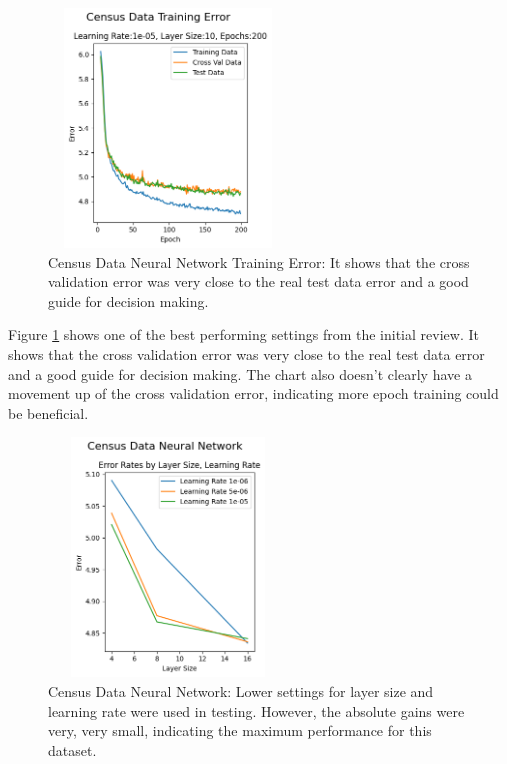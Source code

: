 \documentclass[letterpaper]{article} %
\begin{document}
\begin{figure}[htb]
\centering
\includegraphics[width=2.5in, height=2.5in]{figures/Census_Data_Training_Error_Learning_Rate_chart_one.png}
\caption{Census Data Neural Network Training Error:  It shows that the cross validation error was very close to the real test data error and a good guide for decision making.  }
\label{fig:census_neural_network_error}
\end{figure}

Figure \ref{fig:census_neural_network_error} shows one of the best performing settings from the initial review.  It shows that the cross validation error was very close to the real test data error and a good guide for decision making.  The chart also doesn't clearly have a movement up of the cross validation error, indicating more epoch training could be beneficial.

\begin{figure}[htb]
\centering
\includegraphics[width=2.5in, height=2.5in]{figures/Census_Data_Neural_Network_Error_Rates_by_Layer_Size__Learning_Rate_census_v2.png}
\caption{Census Data Neural Network:   Lower settings for layer size and learning rate were used in testing.   However, the absolute gains were very, very small, indicating the maximum performance for this dataset.   }
\label{fig:census_neural_network_v2}
\end{figure}
\end{document}

